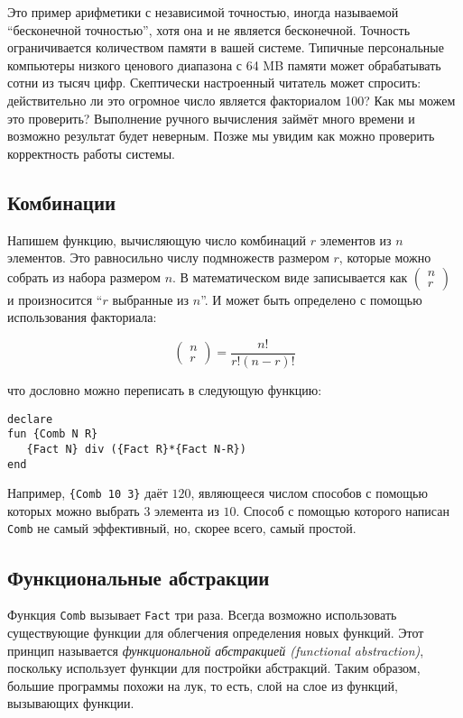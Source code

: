Это пример арифметики с независимой точностью, иногда называемой ``бесконечной точностью'', хотя она и не является бесконечной. Точность ограничивается количеством памяти в вашей системе. Типичные персональные компьютеры низкого ценового диапазона с 64 MB памяти может обрабатывать сотни из тысяч цифр. Скептически настроенный читатель может спросить: действительно ли это огромное число является факториалом 100? Как мы можем это проверить? Выполнение ручного вычисления займёт много времени и возможно результат будет неверным. Позже мы увидим как можно проверить корректность работы системы.

\subsection{Комбинации}

Напишем функцию, вычисляющую число комбинаций $r$ элементов из $n$ элементов. Это равносильно числу подмножеств размером $r$, которые можно собрать из набора размером $n$. В математическом виде записывается как $\begin{pmatrix} n \\ r \end{pmatrix}$ и произносится ``$r$ выбранные из $n$''. И может быть определено с помощью использования факториала:

$$
\begin{pmatrix} n \\ r \end{pmatrix} = \frac{n!}{r! (n - r)!}
$$

что дословно можно переписать в следующую функцию:

\begin{lstlisting}
declare
fun {Comb N R}
   {Fact N} div ({Fact R}*{Fact N-R})
end
\end{lstlisting}

Например, \lstinline|{Comb 10 3}| даёт $120$, являющееся числом способов с помощью которых можно выбрать $3$ элемента из $10$. Способ с помощью которого написан \lstinline|Comb| не самый эффективный, но, скорее всего, самый простой.

\subsection{Функциональные абстракции}

Функция \lstinline|Comb| вызывает \lstinline|Fact| три раза. Всегда возможно использовать существующие функции для облегчения определения новых функций. Этот принцип называется \emph{функциональной абстракцией ({functional abstraction})}, поскольку использует функции для постройки абстракций. Таким образом, большие программы похожи на лук, то есть, слой на слое из функций, вызывающих функции.

